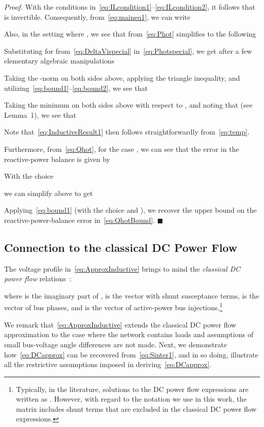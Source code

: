 \documentclass[10 pt, conference]{ieeeconf}
\newcommand{\qedblack}{\hfill \ensuremath{\blacksquare}}
\begin{document}
\noindent \emph{Proof.} With the conditions in~\eqref{eq:ILcondition1}--\eqref{eq:ILcondition2}, it follows that  is invertible. Consequently, from~\eqref{eq:maineq1}, we can write 

Also, in the setting where , we see that  from~\eqref{eq:Phot} simplifies to the following

Substituting for  from~\eqref{eq:DeltaVispecial} in~\eqref{eq:Photspecial}, we get after a few elementary algebraic manipulations

Taking the -norm on both sides above, applying the triangle inequality, and utilizing~\eqref{eq:bound1}--\eqref{eq:bound2}, we see that

Taking the minimum on both sides above with respect to , and noting that  (see Lemma~1), we see that

Note that~\eqref{eq:InductiveResult1} then follows straightforwardly from~\eqref{eq:temp}.

Furthermore, from~\eqref{eq:Qhot}, for the case , we can see that the error in the reactive-power balance is given by

With the choice 

we can simplify above to get 

Applying~\eqref{eq:bound1} (with the choice  and ), we recover the upper bound on the reactive-power-balance error in~\eqref{eq:QhotBound}.
\qedblack


\subsection{Connection to the classical DC Power Flow} \label{sec:DCPowerFlow} 
The voltage profile in~\eqref{eq:ApproxInductive} brings to mind the \emph{classical DC power flow} relations~\cite{Wood:1996}:

where  is the imaginary part of ,  is the vector with shunt susceptance terms,  is the vector of bus phases, and  is the vector of active-power bus injections.\footnote{Typically, in the literature, solutions to the DC power flow expressions are written as . However, with regard to the notation we use in this work, the matrix  includes shunt terms that are excluded in the classical DC power flow expressions.}

We remark that~\eqref{eq:ApproxInductive} extends the classical DC power flow approximation to the case where the network contains  loads and assumptions of small bus-voltage angle differences are not made. Next, we demonstrate how~\eqref{eq:DCapprox} can be recovered from~\eqref{eq:Sinter1}, and in so doing, illustrate all the restrictive assumptions imposed in deriving~\eqref{eq:DCapprox}. 
\end{document}
